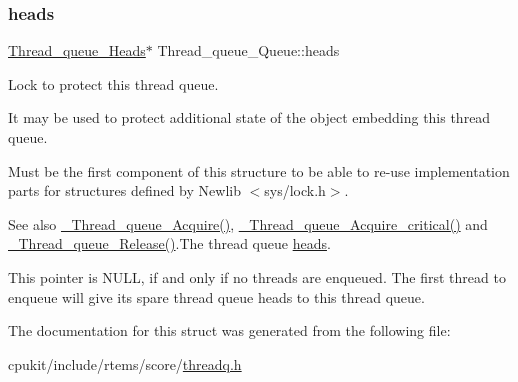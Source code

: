 \subsubsection{\texorpdfstring{heads}{heads}}
{\footnotesize\ttfamily \mbox{\hyperlink{group__RTEMSScoreThreadQueue_gaebac32033b009cc8f606a90bd389f8e9}{Thread\+\_\+queue\+\_\+\+Heads}}$\ast$ Thread\+\_\+queue\+\_\+\+Queue\+::heads}



Lock to protect this thread queue. 

It may be used to protect additional state of the object embedding this thread queue.

Must be the first component of this structure to be able to re-\/use implementation parts for structures defined by Newlib $<$sys/lock.\+h$>$.

\begin{DoxySeeAlso}{See also}
\mbox{\hyperlink{group__RTEMSScoreThreadQueue_ga40080175681761a842fe6ab4784735b9}{\+\_\+\+Thread\+\_\+queue\+\_\+\+Acquire()}}, \mbox{\hyperlink{group__RTEMSScoreThreadQueue_ga2bb5c604a28a636950cca7aa43a47869}{\+\_\+\+Thread\+\_\+queue\+\_\+\+Acquire\+\_\+critical()}} and \mbox{\hyperlink{group__RTEMSScoreThreadQueue_ga0a8881ef4106a0707b2751cdd3d18bef}{\+\_\+\+Thread\+\_\+queue\+\_\+\+Release()}}.The thread queue \mbox{\hyperlink{structThread__queue__Queue_abbac66736a3f2fdec789b832c7386243}{heads}}.
\end{DoxySeeAlso}
This pointer is N\+U\+LL, if and only if no threads are enqueued. The first thread to enqueue will give its spare thread queue heads to this thread queue. 

The documentation for this struct was generated from the following file\+:\begin{DoxyCompactItemize}
\item 
cpukit/include/rtems/score/\mbox{\hyperlink{threadq_8h}{threadq.\+h}}\end{DoxyCompactItemize}

